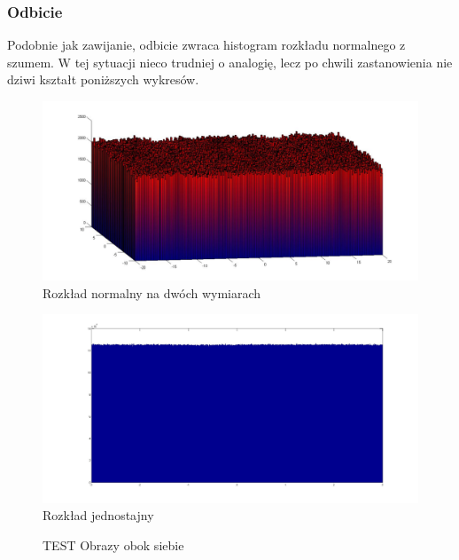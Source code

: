 \documentclass{mini}
\begin{document}
\subsubsection*{Odbicie}
Podobnie jak zawijanie, odbicie zwraca histogram rozkładu normalnego z szumem. W tej sytuacji nieco trudniej o analogię, lecz po chwili zastanowienia nie dziwi kształt poniższych wykresów.
\begin{figure}[H]
\centering
\includegraphics[width=\textwidth]{rf_n_10M_2__20_20__10_10_4_2}
\caption{Rozkład normalny na dwóch wymiarach}
\end{figure}

\begin{figure}[H]
\centering
\includegraphics[width=\textwidth]{rf_j_100M_1__3_3}
\caption{Rozkład jednostajny}
\end{figure}

\begin{figure}[H]
\centering
{}
\quad
{}
\caption{TEST Obrazy obok siebie}
\end{figure}
\end{document}
